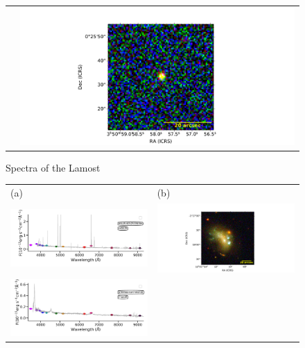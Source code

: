 \documentclass[fleqn,usenatbib]{mnras}
\begin{document}
{\begin{figure}
\begin{tabular}{ll}
    & \includegraphics[width=0.4\linewidth, trim=10 0 10 20, clip]{Figs/STRIPE82-0084-014280_57-0_80_r.pdf} \\
  \end{tabular}
  \caption{Spectra of the Lamost }
  \label{fig:color-diagram}
\end{figure}

\begin{figure}
  \setlength\tabcolsep{0pt}
  \begin{tabular}{ll}
    (a) & (b) \\
    \includegraphics[trim=10 0 10 20, clip]{Figs/spec-0331-52368-0449-SPLUS-n02s23-034336.pdf}
    & \includegraphics[width=0.4\linewidth, trim=10 0 10 20, clip]{Figs/SPLUS-n02s23-034336_180-1_200_r.pdf} \\
    \includegraphics[trim=10 0 10 20, clip]{Figs/spec-9152-58041-0463-STRIPE82-0147-005730.pdf}

\end{tabular}
\end{figure}}
\end{document}
